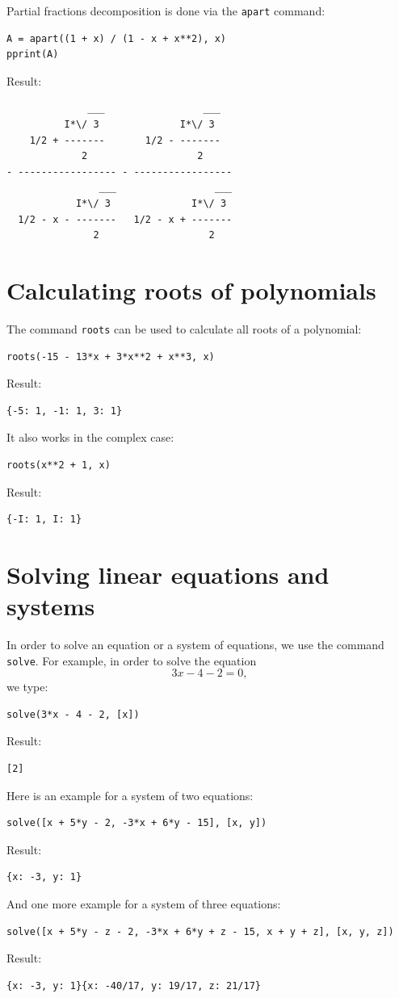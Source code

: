 \documentclass{article}
\begin{document}
Partial fractions decomposition is done via the {\tt apart} command:
\begin{verbatim}
A = apart((1 + x) / (1 - x + x**2), x)
pprint(A)
\end{verbatim}
Result:
\begin{verbatim}
              ___                 ___  
          I*\/ 3              I*\/ 3   
    1/2 + -------       1/2 - -------  
             2                   2     
- ----------------- - -----------------
                ___                 ___
            I*\/ 3              I*\/ 3 
  1/2 - x - -------   1/2 - x + -------
               2                   2   
\end{verbatim}

\section{Calculating roots of polynomials}

The command {\tt roots} can be used to calculate all roots of a polynomial:
\begin{verbatim}
roots(-15 - 13*x + 3*x**2 + x**3, x)
\end{verbatim}
Result:
\begin{verbatim}
{-5: 1, -1: 1, 3: 1}
\end{verbatim}
It also works in the complex case:
\begin{verbatim}
roots(x**2 + 1, x)
\end{verbatim}
Result:
\begin{verbatim}
{-I: 1, I: 1}
\end{verbatim}


\section{Solving linear equations and systems}

In order to solve an equation or a system of equations, we use the command {\tt solve}.
For example, in order to solve the equation 
$$
3x - 4 - 2 = 0,
$$
we type:
\begin{verbatim}
solve(3*x - 4 - 2, [x])
\end{verbatim}
Result:
\begin{verbatim}
[2]
\end{verbatim}
\noindent
Here is an example for a system of two equations:
\begin{verbatim}
solve([x + 5*y - 2, -3*x + 6*y - 15], [x, y])
\end{verbatim}
Result:
\begin{verbatim}
{x: -3, y: 1}
\end{verbatim}
And one more example for a system of three equations:
\begin{verbatim}
solve([x + 5*y - z - 2, -3*x + 6*y + z - 15, x + y + z], [x, y, z])
\end{verbatim}
Result:
\begin{verbatim}
{x: -3, y: 1}{x: -40/17, y: 19/17, z: 21/17}
\end{verbatim}
\noindent
\end{document}
